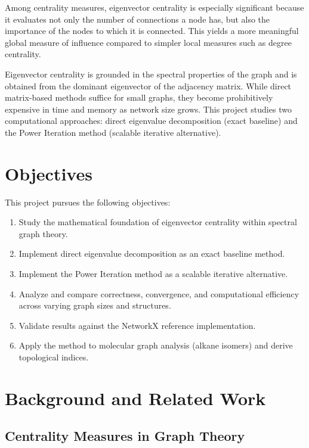 \documentclass[12pt]{article}
\begin{document}
Among centrality measures, eigenvector centrality is especially significant because it evaluates not only the number of connections a node has, but also the importance of the nodes to which it is connected. This yields a more meaningful global measure of influence compared to simpler local measures such as degree centrality.

Eigenvector centrality is grounded in the spectral properties of the graph and is obtained from the dominant eigenvector of the adjacency matrix. While direct matrix-based methods suffice for small graphs, they become prohibitively expensive in time and memory as network size grows. This project studies two computational approaches: direct eigenvalue decomposition (exact baseline) and the Power Iteration method (scalable iterative alternative).

\section{Objectives}

This project pursues the following objectives:

\begin{enumerate}
    \item Study the mathematical foundation of eigenvector centrality within spectral graph theory.
    \item Implement direct eigenvalue decomposition as an exact baseline method.
    \item Implement the Power Iteration method as a scalable iterative alternative.
    \item Analyze and compare correctness, convergence, and computational efficiency across varying graph sizes and structures.
    \item Validate results against the NetworkX reference implementation.
    \item Apply the method to molecular graph analysis (alkane isomers) and derive topological indices.
\end{enumerate}

\section{Background and Related Work}

\subsection{Centrality Measures in Graph Theory}
\end{document}
